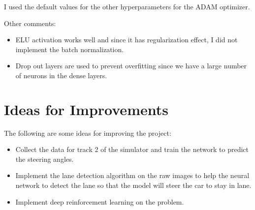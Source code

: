 \documentclass[12pt,twoside]{article}
\begin{document}
I used the default values for the other hyperparameters for the ADAM optimizer.

Other comments:
\begin{itemize}
	\item ELU activation works well and since it has regularization effect, I did not implement the batch normalization.
	\item Drop out layers are used to prevent overfitting since we have a large number of neurons in the dense layers.
\end{itemize}


\newpage

\section{Ideas for Improvements}
The following are some ideas for improving the project:
\begin{itemize}
	\item Collect the data for track 2 of the simulator and train the network to predict the steering angles.
	\item Implement the lane detection algorithm on the raw images to help the neural network to detect the lane so that the model will steer the car to stay in lane.
	\item Implement deep reinforcement learning on the problem. 
\end{itemize}



%
%
\end{document}

